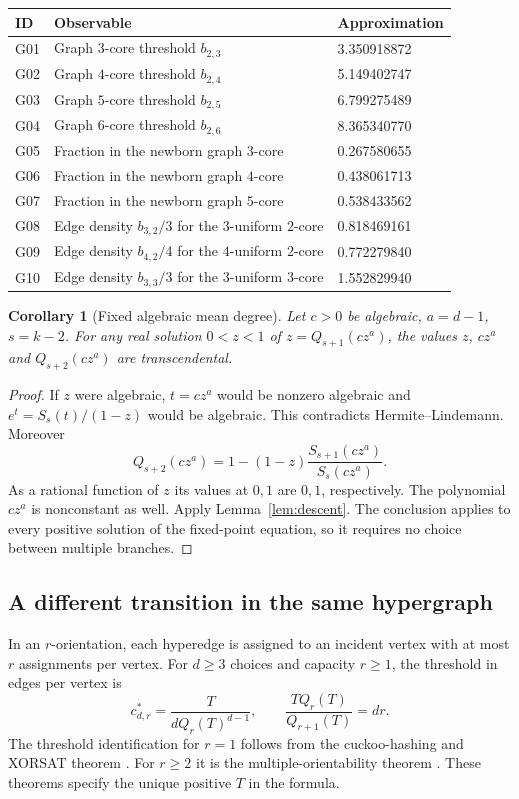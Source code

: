 \documentclass[11pt,a4paper]{article}
\newtheorem{corollary}[theorem]{Corollary}
\theoremstyle{definition}
\theoremstyle{remark}
\begin{document}
\begin{center}\small
\begin{tabular}{@{}lll@{}}\toprule
ID & Observable & Approximation\\\midrule
G01 & Graph $3$-core threshold $b_{2,3}$ & 3.350918872\\
G02 & Graph $4$-core threshold $b_{2,4}$ & 5.149402747\\
G03 & Graph $5$-core threshold $b_{2,5}$ & 6.799275489\\
G04 & Graph $6$-core threshold $b_{2,6}$ & 8.365340770\\
G05 & Fraction in the newborn graph $3$-core & 0.267580655\\
G06 & Fraction in the newborn graph $4$-core & 0.438061713\\
G07 & Fraction in the newborn graph $5$-core & 0.538433562\\
G08 & Edge density $b_{3,2}/3$ for the $3$-uniform $2$-core & 0.818469161\\
G09 & Edge density $b_{4,2}/4$ for the $4$-uniform $2$-core & 0.772279840\\
G10 & Edge density $b_{3,3}/3$ for the $3$-uniform $3$-core & 1.552829940\\
\bottomrule\end{tabular}
\end{center}

\begin{corollary}[Fixed algebraic mean degree]\label{cor:gfixed}
Let $c>0$ be algebraic, $a=d-1$, $s=k-2$. For any real solution
$0<z<1$ of $z=Q_{s+1}(c z^a)$, the values $z$, $c z^a$ and
$Q_{s+2}(c z^a)$ are transcendental.
\end{corollary}
\begin{proof}
If $z$ were algebraic, $t=c z^a$ would be nonzero algebraic and
$e^t=S_s(t)/(1-z)$ would be algebraic. This contradicts
Hermite--Lindemann. Moreover
\[
 Q_{s+2}(c z^a)=1-(1-z)\frac{S_{s+1}(c z^a)}{S_s(c z^a)} .
\]
As a rational function of $z$ its values at $0,1$ are $0,1$, respectively.
The polynomial $c z^a$ is nonconstant as well. Apply
Lemma~\ref{lem:descent}. The conclusion applies to every positive solution
of the fixed-point equation, so it requires no choice between multiple branches.
\end{proof}

\subsection{A different transition in the same hypergraph}
In an $r$-orientation, each hyperedge is assigned to an incident vertex
with at most $r$ assignments per vertex. For $d\ge3$ choices and capacity
$r\ge1$, the threshold in edges per vertex is
\[
 c^*_{d,r}=\frac{T}{d Q_r(T)^{d-1}},\qquad
 \frac{T Q_r(T)}{Q_{r+1}(T)}=dr .
\]
The threshold identification for $r=1$ follows from the cuckoo-hashing and
XORSAT theorem \cite{gCuckoo,gXor}. For $r\ge2$ it is the
multiple-orientability theorem \cite{gFKP}. These theorems specify the
unique positive $T$ in the formula.
\end{document}
